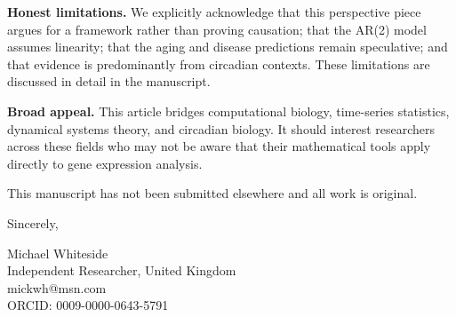 \documentclass[11pt,letterpaper]{article}
\begin{document}
\vspace{0.3cm}

\textbf{Honest limitations.} We explicitly acknowledge that this perspective piece argues for a framework rather than proving causation; that the AR(2) model assumes linearity; that the aging and disease predictions remain speculative; and that evidence is predominantly from circadian contexts. These limitations are discussed in detail in the manuscript.

\vspace{0.3cm}

\textbf{Broad appeal.} This article bridges computational biology, time-series statistics, dynamical systems theory, and circadian biology. It should interest researchers across these fields who may not be aware that their mathematical tools apply directly to gene expression analysis.

\vspace{0.3cm}

This manuscript has not been submitted elsewhere and all work is original.

\vspace{0.5cm}

Sincerely,

\vspace{0.5cm}

Michael Whiteside \\
Independent Researcher, United Kingdom \\
mickwh@msn.com \\
ORCID: 0009-0000-0643-5791
\end{document}
